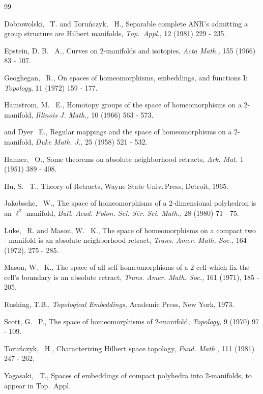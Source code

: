 \documentclass[11pt]{amsart}
\theoremstyle{definition}
\newtheorem*{Proof of Theorem 3.1}{Proof of Theorem 3.1}
\newtheorem*{Proof of Corollary 3.1}{Proof of Corollary 3.1}
\newtheorem*{Proof of Proposition 4.1.(1)}{Proof of Proposition 4.1.(1)}
\newtheorem*{Proof of Proposition 4.1.(2)}{Proof of Proposition 4.1.(2)}
\newtheorem*{Proof of Corollary 1.1}{Proof of Corollary 1.1}
\begin{document}
\vskip 2mm

\begin{thebibliography}{99}

Dobrowolski, ~T. and Toru\'nczyk, ~H., Separable complete ANR's admitting a group structure are Hilbert manifolds, {\sl Top.\, Appl.}, 12 (1981) 229 - 235.

Epstein, D. B. ~A., Curves on 2-manifolds and isotopies, {\sl Acta Math.,} 155 (1966) 83 - 107.

Geoghegan, ~R.,
On spaces of homeomorphisms, embeddings, and functions I: 
{\sl Topology}, 11 (1972) 159 - 177. 

Hamstrom, M. ~E., Homotopy groups of the space of homeomorphisms on a 2-manifold,
{\sl Illinois J. Math.,} 10 (1966) 563 - 573. 

\bysame and Dyer ~E., Regular mappings and the space of homeomorphisms on a 2-manifold, {\sl Duke Math. J.,} 25 (1958) 521 - 532. 

Hanner, ~O., Some theorems on absolute neighborhood retracts, {\sl Ark. Mat.} 1 (1951) 389 - 408.

Hu, S. ~T., Theory of Retracts, Wayne State Univ.\,Press, Detroit, 1965.

Jakobsche, ~W., The space of homeomorphisms of a 2-dimensional polyhedron is an $\ell^2$-manifold,
{\sl Bull. Acad. Polon. Sci. S\'er. Sci. Math.,} 28 (1980) 71 - 75. 

Luke, ~R. and Mason, W. ~K.,
The space of homeomorphisms on a compact two - manifold is an absolute neighborhood retract,
{\sl Trans. Amer. Math. Soc.,} 164 (1972), 275 - 285. 

Mason, W. ~K.,
The space of all self-homeomorphisms of a 2-cell which fix the cell's boundary is an absolute retract,
{\sl Trans. Amer. Math. Soc.,} 161 (1971), 185 - 205. 

Rushing, T.B., {\it Topological Embeddings,} Academic Press, New York, 1973. 

Scott, G. ~P., The space of homeomorphisms of 2-manifold, {\sl Topology,} 9 (1970) 97 - 109.

Toru\'nczyk, ~H., Characterizing Hilbert space topology, {\sl Fund. Math.,} 111 (1981) 247 - 262.

Yagasaki, ~T., Spaces of embeddings of compact polyhedra into 2-manifolds, to appear in  Top.\, Appl.

\end{thebibliography}
\end{document}
